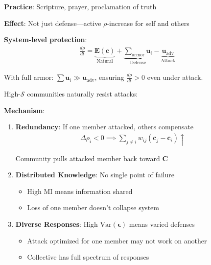 \documentclass[11pt,a4paper]{article}
\theoremstyle{definition}
\theoremstyle{remark}
\newcommand{\EE}{\mathbf{E}}
\newcommand{\cc}{\mathbf{c}}
\begin{document}
\begin{small}
\begin{enumerate}
\begin{protocol}
\begin{enumerate}
        \textbf{Practice}: Scripture, prayer, proclamation of truth
        
        \textbf{Effect}: Not just defense—active \(\rho\)-increase for self and others
\end{enumerate}

\textbf{System-level protection}:
\begin{align}
\frac{d\rho}{dt} = \underbrace{\EE(\cc)}_{\text{Natural}} + \underbrace{\sum_{\text{armor}} \mathbf{u}_i}_{\text{Defense}} - \underbrace{\mathbf{u}_{\text{adv}}}_{\text{Attack}}
\end{align}

With full armor: \(\sum \mathbf{u}_i \gg \mathbf{u}_{\text{adv}}\), ensuring \(\frac{d\rho}{dt} > 0\) even under attack.
\end{protocol}

\begin{protocol}
High-\(\mathcal{S}\) communities naturally resist attacks:

\textbf{Mechanism}:
\begin{enumerate}
    \item \textbf{Redundancy}: If one member attacked, others compensate
        \begin{align}
        \Delta\rho_i < 0 \implies \sum_{j \neq i} w_{ij}(\cc_j - \cc_i) \uparrow
        \end{align}
        
        Community pulls attacked member back toward \(\mathbf{C}\)
    
    \item \textbf{Distributed Knowledge}: No single point of failure
        \begin{itemize}
            \item High \(\text{MI}\) means information shared
            \item Loss of one member doesn't collapse system
        \end{itemize}
    
    \item \textbf{Diverse Responses}: High \(\text{Var}(\boldsymbol{\epsilon})\) means varied defenses
        \begin{itemize}
            \item Attack optimized for one member may not work on another
            \item Collective has full spectrum of responses
        \end{itemize}
    

\end{enumerate}
\end{protocol}
\end{enumerate}
\end{small}
\end{document}
